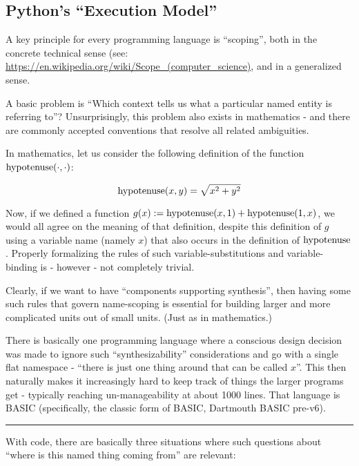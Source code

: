 \documentclass[11pt]{article}
\begin{document}
    \hypertarget{pythons-execution-model}{%
\subsection{Python's ``Execution
Model''}\label{pythons-execution-model}}

    A key principle for every programming language is ``scoping'', both in
the concrete technical sense (see:
\url{https://en.wikipedia.org/wiki/Scope_(computer_science)}, and in a
generalized sense.

A basic problem is ``Which context tells us what a particular named
entity is referring to''? Unsurprisingly, this problem also exists in
mathematics - and there are commonly accepted conventions that resolve
all related ambiguities.

In mathematics, let us consider the following definition of the function
\({\rm hypotenuse}(\cdot, \cdot)\):

\[
{\rm hypotenuse}(x, y)=\sqrt{x^2+y^2}
\]

Now, if we defined a function
\(g(x):={\rm hypotenuse}(x, 1)+{\rm hypotenuse}(1, x)\), we would all
agree on the meaning of that definition, despite this definition of
\(g\) using a variable name (namely \(x\)) that also occurs in the
definition of \({\rm hypotenuse}\). Properly formalizing the rules of
such variable-substitutions and variable-binding is - however - not
completely trivial.

Clearly, if we want to have ``components supporting synthesis'', then
having some such rules that govern name-scoping is essential for
building larger and more complicated units out of small units. (Just as
in mathematics.)

There is basically one programming language where a conscious design
decision was made to ignore such ``synthesizability'' considerations and
go with a single flat namespace - ``there is just one thing around that
can be called \(x\)''. This then naturally makes it increasingly hard to
keep track of things the larger programs get - typically reaching
un-manageability at about 1000 lines. That language is BASIC
(specifically, the classic form of BASIC, Dartmouth BASIC pre-v6).

\begin{center}\rule{0.5\linewidth}{0.5pt}\end{center}

With code, there are basically three situations where such questions
about ``where is this named thing coming from'' are relevant:
\end{document}
